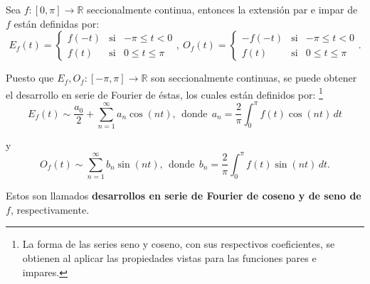 Sea $f:[0,\pi] \longrightarrow \mathbb{R}$ seccionalmente continua, entonces la extensión par e impar de $f$ están definidas por:
\begin{equation*}
    E_f(t) = \left\{ \begin{array}{cll}
    f(-t)     & \mbox{si} & -\pi \leq t < 0 \\
    f(t)     & \mbox{si} & 0 \leq t \leq \pi
    \end{array} \right. , ~ O_f(t) = \left\{ \begin{array}{cll}
    -f(-t)     & \mbox{si} & -\pi \leq t < 0 \\
    f(t)     & \mbox{si} & 0 \leq t \leq \pi
    \end{array} \right. .
\end{equation*}

Puesto que $E_f, O_f: [-\pi,\pi] \to \mathbb{R}$ son seccionalmente continuas, se puede obtener el desarrollo en serie de Fourier de éstas, los cuales están definidos por: \footnote{La forma de las series seno y coseno, con sus respectivos coeficientes, se obtienen al aplicar las propiedades vistas para las funciones pares e impares.}
$$ E_f(t) \sim \frac{a_0}{2}  + \sum_{n=1}^{\infty} a_n \cos(nt), ~~\mbox{donde}~~ a_n = \frac{2}{\pi} \int_0^{\pi} f(t) \cos(nt)\,dt$$

y
$$ O_f(t) \sim  \sum_{n=1}^{\infty} b_n \sin(nt), ~~\mbox{donde} ~~ b_n = \frac{2}{\pi} \int_0^{\pi} f(t) \sin (nt)\,dt.$$

Estos son llamados \textbf{desarrollos en serie de Fourier de coseno y de seno de $f$}, respectivamente.






